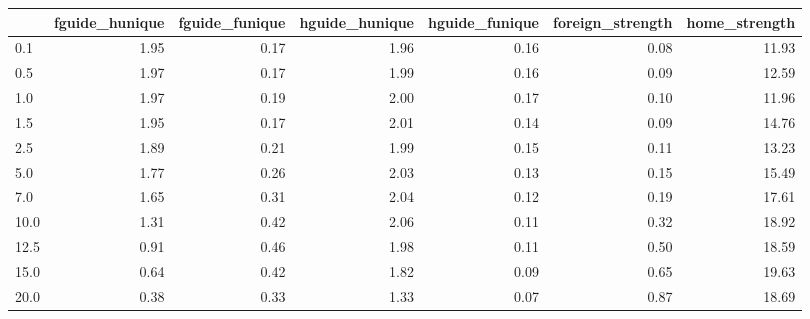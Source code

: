 \begin{tabular}{lrrrrrr}
\toprule
 & fguide_hunique & fguide_funique & hguide_hunique & hguide_funique & foreign_strength & home_strength \\
\midrule
0.1 & 1.95 & 0.17 & 1.96 & 0.16 & 0.08 & 11.93 \\
0.5 & 1.97 & 0.17 & 1.99 & 0.16 & 0.09 & 12.59 \\
1.0 & 1.97 & 0.19 & 2.00 & 0.17 & 0.10 & 11.96 \\
1.5 & 1.95 & 0.17 & 2.01 & 0.14 & 0.09 & 14.76 \\
2.5 & 1.89 & 0.21 & 1.99 & 0.15 & 0.11 & 13.23 \\
5.0 & 1.77 & 0.26 & 2.03 & 0.13 & 0.15 & 15.49 \\
7.0 & 1.65 & 0.31 & 2.04 & 0.12 & 0.19 & 17.61 \\
10.0 & 1.31 & 0.42 & 2.06 & 0.11 & 0.32 & 18.92 \\
12.5 & 0.91 & 0.46 & 1.98 & 0.11 & 0.50 & 18.59 \\
15.0 & 0.64 & 0.42 & 1.82 & 0.09 & 0.65 & 19.63 \\
20.0 & 0.38 & 0.33 & 1.33 & 0.07 & 0.87 & 18.69 \\
\bottomrule
\end{tabular}
